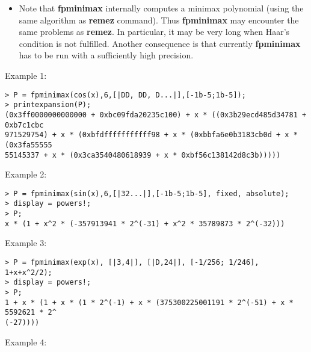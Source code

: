 \begin{itemize}
\item Note that \textbf{fpminimax} internally computes a minimax polynomial (using
   the same algorithm as \textbf{remez} command). Thus \textbf{fpminimax} may encounter
   the same problems as \textbf{remez}. In particular, it may be very long 
   when Haar's condition is not fulfilled. Another consequence is that
   currently \textbf{fpminimax} has to be run with a sufficiently high precision.
\end{itemize}
\noindent Example 1: 
\begin{center}\begin{minipage}{15cm}\begin{Verbatim}[frame=single]
> P = fpminimax(cos(x),6,[|DD, DD, D...|],[-1b-5;1b-5]);
> printexpansion(P);
(0x3ff0000000000000 + 0xbc09fda20235c100) + x * ((0x3b29ecd485d34781 + 0xb7c1cbc
971529754) + x * (0xbfdfffffffffff98 + x * (0xbbfa6e0b3183cb0d + x * (0x3fa55555
55145337 + x * (0x3ca3540480618939 + x * 0xbf56c138142d8c3b)))))
\end{Verbatim}
\end{minipage}\end{center}
\noindent Example 2: 
\begin{center}\begin{minipage}{15cm}\begin{Verbatim}[frame=single]
> P = fpminimax(sin(x),6,[|32...|],[-1b-5;1b-5], fixed, absolute);
> display = powers!;
> P;
x * (1 + x^2 * (-357913941 * 2^(-31) + x^2 * 35789873 * 2^(-32)))
\end{Verbatim}
\end{minipage}\end{center}
\noindent Example 3: 
\begin{center}\begin{minipage}{15cm}\begin{Verbatim}[frame=single]
> P = fpminimax(exp(x), [|3,4|], [|D,24|], [-1/256; 1/246], 1+x+x^2/2);
> display = powers!;
> P;
1 + x * (1 + x * (1 * 2^(-1) + x * (375300225001191 * 2^(-51) + x * 5592621 * 2^
(-27))))
\end{Verbatim}
\end{minipage}\end{center}
\noindent Example 4: 
